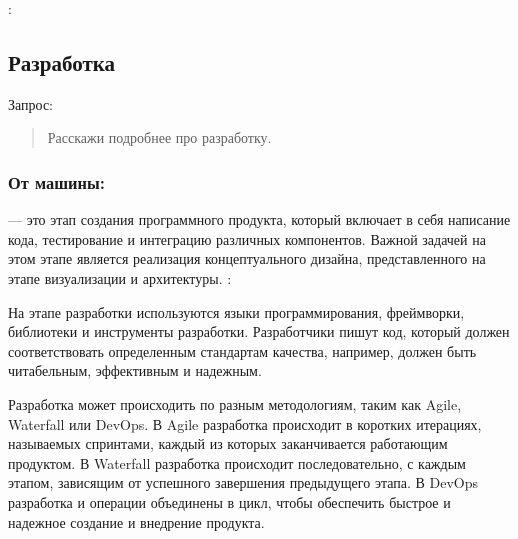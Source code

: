 \documentclass[letterpaper,10pt,russian]{sphinxmanual}
\begin{document}
\sphinxAtStartPar
{}: 


\subsection{Разработка}
\label{\detokenize{educational_materials/stages/content:id11}}
\sphinxAtStartPar
Запрос:
\begin{quote}

\sphinxAtStartPar
Расскажи подробнее про разработку.
\end{quote}


\subsubsection{От машины:}
\label{\detokenize{educational_materials/stages/content:id12}}
\sphinxAtStartPar
{} — это этап создания программного продукта, который включает в себя написание кода, тестирование и интеграцию различных компонентов. Важной задачей на этом этапе является реализация концептуального дизайна, представленного на этапе визуализации и архитектуры. : 

\sphinxAtStartPar
На этапе разработки используются языки программирования, фреймворки, библиотеки и инструменты разработки. Разработчики пишут код, который должен соответствовать определенным стандартам качества, например, должен быть читабельным, эффективным и надежным.

\sphinxAtStartPar
Разработка может происходить по разным методологиям, таким как Agile, Waterfall или DevOps. В Agile разработка происходит в коротких итерациях, называемых спринтами, каждый из которых заканчивается работающим продуктом. В Waterfall разработка происходит последовательно, с каждым этапом, зависящим от успешного завершения предыдущего этапа. В DevOps разработка и операции объединены в цикл, чтобы обеспечить быстрое и надежное создание и внедрение продукта.
\end{document}
